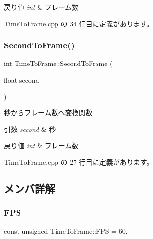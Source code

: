 \begin{DoxyRetVals}{戻り値}
{\em int} & フレーム数 \\
\hline
\end{DoxyRetVals}


 Time\+To\+Frame.\+cpp の 34 行目に定義があります。

\mbox{\label{class_time_to_frame_a02fe55cc63bdffd73d092d30cc7f0153}} 
\subsubsection{\texorpdfstring{Second\+To\+Frame()}{SecondToFrame()}}
{\footnotesize\ttfamily int Time\+To\+Frame\+::\+Second\+To\+Frame (\begin{DoxyParamCaption}\item[{float}]{second }\end{DoxyParamCaption})\hspace{0.3cm}{\ttfamily [static]}}



秒からフレーム数へ変換関数 


\begin{DoxyParams}{引数}
{\em second} & 秒 \\
\hline
\end{DoxyParams}

\begin{DoxyRetVals}{戻り値}
{\em int} & フレーム数 \\
\hline
\end{DoxyRetVals}


 Time\+To\+Frame.\+cpp の 27 行目に定義があります。



\subsection{メンバ詳解}
\mbox{\label{class_time_to_frame_a2e16dc9c8965177964d86eb7b67e5254}} 
\subsubsection{\texorpdfstring{F\+PS}{FPS}}
{\footnotesize\ttfamily const unsigned Time\+To\+Frame\+::\+F\+PS = 60\hspace{0.3cm}{\ttfamily [static]}, {\ttfamily [private]}}



